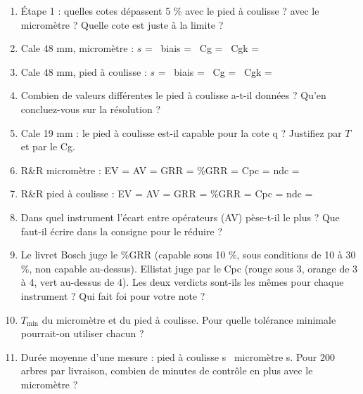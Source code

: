 \documentclass[10pt,a4paper]{article}
\begin{document}
\begin{enumerate}[label=\textcolor{cyan}{\textbf{Q\arabic*.}},leftmargin=22pt]
\item Étape 1 : quelles cotes dépassent 5 \% avec le pied à coulisse ? avec le micromètre ? Quelle cote est juste à la limite ?\reponse[2]
\item Cale 48 mm, micromètre : $s$ = \champ{14mm} \ biais = \champ{14mm} \ Cg = \champ{12mm} \ Cgk = \champ{12mm}\par\vspace{5pt}
\item Cale 48 mm, pied à coulisse : $s$ = \champ{14mm} \ biais = \champ{14mm} \ Cg = \champ{12mm} \ Cgk = \champ{12mm}\par\vspace{5pt}
\item Combien de valeurs différentes le pied à coulisse a-t-il données ? Qu'en concluez-vous sur la résolution ?\reponse[2]
\item Cale 19 mm : le pied à coulisse est-il capable pour la cote q ? Justifiez par $T$ et par le Cg.\reponse[2]
\item R\&R micromètre : EV = \champ{14mm} AV = \champ{14mm} GRR = \champ{14mm} \%GRR = \champ{12mm} Cpc = \champ{10mm} ndc = \champ{10mm}\par\vspace{5pt}
\item R\&R pied à coulisse : EV = \champ{14mm} AV = \champ{14mm} GRR = \champ{14mm} \%GRR = \champ{12mm} Cpc = \champ{10mm} ndc = \champ{10mm}\par\vspace{5pt}
\item Dans quel instrument l'écart entre opérateurs (AV) pèse-t-il le plus ? Que faut-il écrire dans la consigne pour le réduire ?\reponse[2]
\item Le livret Bosch juge le \%GRR (capable sous 10 \%, sous conditions de 10 à 30 \%, non capable au-dessus). Ellistat juge par le Cpc (rouge sous 3, orange de 3 à 4, vert au-dessus de 4). Les deux verdicts sont-ils les mêmes pour chaque instrument ? Qui fait foi pour votre note ?\reponse[3]
\item $T_{\min}$ du micromètre et du pied à coulisse. Pour quelle tolérance minimale pourrait-on utiliser chacun ?\reponse[2]
\item Durée moyenne d'une mesure : pied à coulisse \champ{14mm} s \ micromètre \champ{14mm} s. Pour 200 arbres par livraison, combien de minutes de contrôle en plus avec le micromètre ?\reponse[2]
\end{enumerate}
\end{document}
